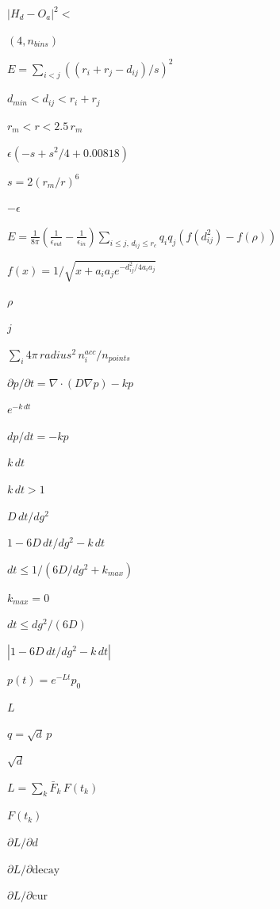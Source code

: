 \documentclass{article}
\begin{document}
$|H_d - O_a|^2 < $
\pagebreak

$(4, n_{bins})$
\pagebreak

$E = \sum_{i<j} ((r_i + r_j - d_{ij}) / s)^2$
\pagebreak

$d_{min} < d_{ij} < r_i + r_j$
\pagebreak

$r_m < r < 2.5\,r_m$
\pagebreak

$\epsilon(-s + s^2/4 + 0.00818)$
\pagebreak

$s = 2 (r_m/r)^6$
\pagebreak

$-\epsilon$
\pagebreak

$E = \frac{1}{8\pi}\left(\frac{1}{\epsilon_{out}} - \frac{1}{\epsilon_{in}}\right)
\sum_{i \le j,\, d_{ij} \le r_c} q_i q_j \left(f(d_{ij}^2) - f(\rho)\right)$
\pagebreak

$f(x) = 1/\sqrt{x + a_i a_j e^{-d_{ij}^2 / 4 a_i a_j}}$
\pagebreak

$\rho$
\pagebreak

$j$
\pagebreak

$\sum_i 4\pi\, radius^2\, n_i^{acc} / n_{points}$
\pagebreak

$\partial p/\partial t = \nabla\cdot(D\nabla p) - kp$
\pagebreak

$e^{-k\,dt}$
\pagebreak

$dp/dt = -kp$
\pagebreak

$k\,dt$
\pagebreak

$k\,dt > 1$
\pagebreak

$D\,dt/dg^2$
\pagebreak

$1 - 6D\,dt/dg^2 - k\,dt$
\pagebreak

$dt \le 1/(6D/dg^2 + k_{max})$
\pagebreak

$k_{max} = 0$
\pagebreak

$dt \le dg^2/(6D)$
\pagebreak

$|1 - 6D\,dt/dg^2 - k\,dt|$
\pagebreak

$p(t) = e^{-Lt}p_0$
\pagebreak

$L$
\pagebreak

$q = \sqrt{d}\,p$
\pagebreak

$\sqrt{d}$
\pagebreak

$L = \sum_k \bar F_k\, F(t_k)$
\pagebreak

$F(t_k)$
\pagebreak

$\partial L/\partial d$
\pagebreak

$\partial L/\partial \mathrm{decay}$
\pagebreak

$\partial L/\partial \mathrm{cur}$
\pagebreak
\end{document}
